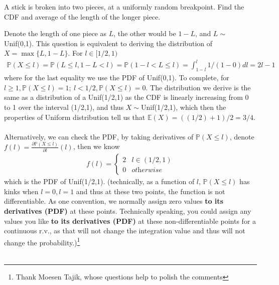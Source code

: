 

\setcounter{theorem}{11}
\begin{exercise}[BH.5.12] A stick is broken into two pieces, at a uniformly random breakpoint. Find the CDF and average of the length of the longer piece.
\begin{solution}
    Denote the length of one piece as $L$, the other would be $1-L$, and $L\sim$Unif(0,1). This question is equivalent to deriving the distribution of $X=\max\{L,1-L\}$.
	For $l\in [1/2,1)$
	\begin{align*}
		\mathbb{P}(X\leq l)=\mathbb{P}(L\leq l, 1-L<l)=\mathbb{P}(1-l<L\leq l) = \int_{1-l}^l 1/(1-0) dl = 2l-1 
	\end{align*}
	where for the last equality we use the PDF of Unif(0,1). To complete, for $l\geq 1, \mathbb{P}(X\leq l)=1;~ l<1/2,  \mathbb{P}(X\leq l)=0$. 
	The distribution we derive is the same as a distribution of a Unif(1/2,1) as the CDF is linearly increasing from 0 to 1 over the interval (1/2,1), and thus  $X\sim$Unif(1/2,1), which then the properties of Uniform distribution tell us that $\mathbb{E}(X) = ((1/2)+1)/2 = 3/4$. \\~\\
	Alternatively, we can check the PDF, by taking derivatives of $\mathbb{P}(X\leq l)$, denote $f(l)= \frac{\partial \mathbb{P}(X\leq l)}{\partial l}(l)$, then we know 
	\begin{align}
		f(l)= \left\{\begin{matrix}
			2 & l\in (1/2,1) \\ 0 & \textit{otherwise}
		\end{matrix}  \right.
	\end{align} 
	which is the PDF of Unif(1/2,1).
	(technically, as a function of $l$, $\mathbb{P}(X\leq l)$ has kinks when $l=0, l=1$ and thus at these two points, the function is not differentiable. As one convention, we normally assign zero values \textbf{to its derivatives (PDF)} at these points. Technically speaking, you could assign any values you like \textbf{to its derivatives (PDF)} at these non-differentiable points for a continuous r.v., as that will not change the integration value and thus will not change the probability.)\footnote{Thank Moesen Tajik, whose questions help to polish the comments}\\~\\
	

\end{solution}
\end{exercise}
